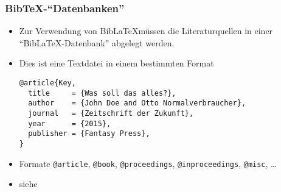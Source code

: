 \begin{frame}[fragile]
  \frametitle{Bib\TeX-\enquote{Datenbanken}}
  \onslide<+->

  \begin{itemize}
  \item<+-> Zur Verwendung von Bib\LaTeX müssen die Literaturquellen in
    einer \enquote{Bib\LaTeX-Datenbank} abgelegt werden.
  \item<+-> Dies ist eine Textdatei in einem bestimmten Format\onslide<+->%
\begin{lstlisting}
@article{Key,
  title     = {Was soll das alles?},
  author    = {John Doe and Otto Normalverbraucher},
  journal   = {Zeitschrift der Zukunft},
  year      = {2015},
  publisher = {Fantasy Press},
}
\end{lstlisting}
  \item<+-> Formate \verb|@article|, \verb|@book|, \verb|@proceedings|,
    \verb|@inproceedings|, \verb|@misc|, \dots
  \item<+-> siehe
  \end{itemize}

\end{frame}


% 

